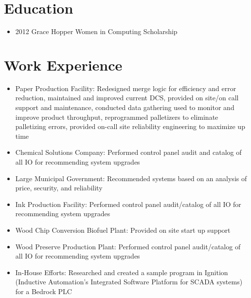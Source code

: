 \documentclass[11pt,letterpaper,sans]{moderncv}        %
\begin{document}
\makecvtitle

\vspace{-16mm}

\section{Education}
\vspace{-1mm}
\begin{itemize}
\item 2012 Grace Hopper Women in Computing Scholarship
\end{itemize}
\vspace{1mm}

\vspace{-1mm}

\section{Work Experience}

\begin{itemize}
\item Paper Production Facility: Redesigned merge logic for efficiency and error reduction, maintained and improved current DCS, provided on site/on call support and maintenance, conducted data gathering used to monitor and improve product throughput, reprogrammed palletizers to eliminate palletizing errors, provided on-call site reliability engineering to maximize up time
\item Chemical Solutions Company: Performed control panel audit and catalog of all IO for recommending system upgrades
\item Large Municipal Government: Recommended systems based on an analysis of price, security, and reliability
\item Ink Production Facility: Performed control panel audit/catalog of all IO for recommending system upgrades
\item Wood Chip Conversion Biofuel Plant: Provided on site start up support
\item Wood Preserve Production Plant: Performed control panel audit/catalog of all IO for recommending system upgrades
\item In-House Efforts: Researched and created a sample program in Ignition (Inductive Automation’s Integrated Software Platform for SCADA systems) for a Bedrock PLC
\end{itemize}
\end{document}
